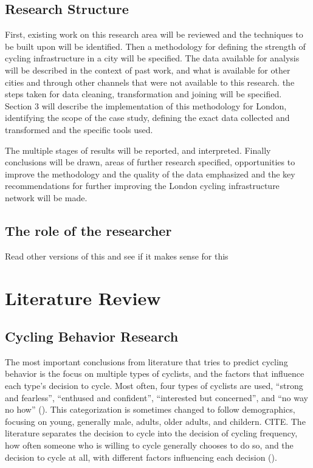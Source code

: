 \documentclass[11pt]{article} %
\begin{document}
\subsection{Research Structure}

First, existing work on this research area will be reviewed and the techniques to be built upon will be identified.  Then a methodology for defining the strength of cycling infrastructure in a city will be specified. The data available for analysis will be described in the context of past work, and what is available for other cities and through other channels that were not available to this research. the steps taken for data cleaning, transformation and joining will be specified. Section 3 will describe the implementation of this methodology for London, identifying the scope of the case study, defining the exact data collected and transformed and the specific tools used. 

The multiple stages of results will be reported, and interpreted. Finally conclusions will be drawn, areas of further research specified, opportunities to improve the methodology and the quality of the data emphasized and the key recommendations for further improving the London cycling infrastructure network will be made. 


\subsection{The role of the researcher}

Read other versions of this and see if it makes sense for this 


\section{Literature Review}

\subsection{Cycling Behavior Research}

The most important conclusions from literature that tries to predict cycling behavior is the focus on multiple types of cyclists, and the factors that influence each type's decision to cycle. Most often, four types of cyclists are used, ``strong and fearless'', ``enthused and confident'', ``interested but concerned'', and ``no way no how'' (\cite{dill2013four}). This categorization is sometimes changed to follow demographics, focusing on young, generally male, adults, older adults, and childern. CITE. The literature separates the decision to cycle into the decision of cycling frequency, how often someone who is willing to cycle generally chooses to do so, and the decision to cycle at all, with different factors influencing each decision (\cite{stinson2005comparison}). 
\end{document}
